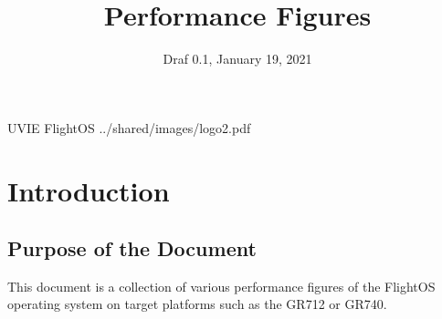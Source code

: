 \title{Performance Figures}
\def \documentid {FLIGHTOS-UVIE-PERF-001}
\date{Draf 0.1, January 19, 2021}

\newcommand\affil[1]{\textsuperscript#1}

\def\preparedby {Armin Luntzer\affil{1}}
\def\checkedby {Roland Ottensamer\affil{1}}
\def\approvedby {Franz Kerschbaum\affil{1}}

\def\affiliations{
	\affil{1} Department of Astrophysics, University of Vienna
}






%


\usepackage{vhistory}

\usepackage[giveninits=true]{biblatex}


\usepackage{listings}


\usepackage{appendix}


\lstset{style=customc} 


\setmainfont{MyriadPro-SemiCondensed}
\uvietitlepage%
{UVIE FlightOS}%
{\doctitle}%
{../shared/images/logo2.pdf}
\setmainfont{MyriadPro}

\approvalpage

\tableofcontents
\newpage



\begin{versionhistory}
\end{versionhistory}


\chapter{Introduction}

\section{Purpose of the Document}

This document is a collection of various performance figures of the FlightOS
operating system on target platforms such as the GR712 or GR740.

